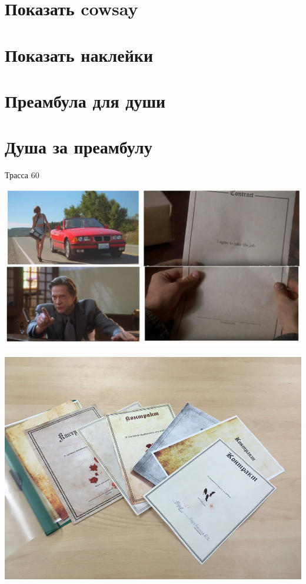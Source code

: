 \documentclass[aspectratio=169]{beamer} %
\begin{document}
\section{Показать cowsay} 

\section{Показать наклейки} 

\section{Преамбула для души} 

\section{Душа за преамбулу} 


\begin{frame}[plain]{Трасса 60}
\begin{center}
\includegraphics[width=0.95\linewidth]{road_60.png}	
\end{center}
\end{frame}


\begin{frame}
\begin{center}
	\includegraphics[width=0.8\linewidth]{contract_2.jpg}	
\end{center}
\end{frame}
\end{document}
